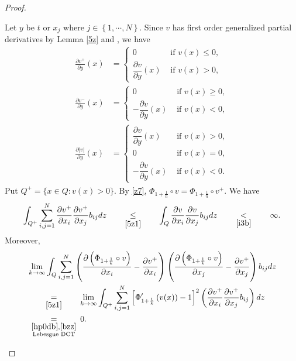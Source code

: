 \documentclass[11pt, a4paper]{article}
\numberwithin{equation}{section}
\newcommand{\coex}[2][\hphantom{longexplanation}]{%
  \underset{{#1}}{\overset{\hphantom{longexplanation}}{#2}}
}
\begin{document}
\begin{proof}
\begin{itemize}[wide]
  Let $y$ be $t$ or $x_{j}$ where $j\in
  \left\{1,\cdots,N\right\}$. Since $v$ has first order generalized
  partial derivatives by Lemma \ref{5z} and  \cite[Lemma 7.6]{gilbargEllipticPartialDifferential2001}, we have
\begin{align}
  \frac{\partial v^{+}}{\partial y}(x)
  &= \begin{cases}
    0 &\text{ if }  v(x) \le 0,   \\
    \dfrac{\partial v}{\partial y}(x) &\text{ if } v(x) > 0, 
\end{cases}
\label{5z1}\\
  \frac{\partial v^{-}}{\partial y}(x)
  &= \begin{cases}
 0 & \text{ if } v(x) \ge 0,  \\
       -\dfrac{\partial v}{\partial y}(x) &\text{ if } v(x) < 0, 
\end{cases}
\label{5z2}\\
  \frac{\partial |v|}{\partial y}(x)
  &= \begin{cases}
  \dfrac{\partial v}{\partial y}(x) &\text{ if } v(x) > 0,  \\
 0 &\text{ if } v(x)= 0,  \\
       -\dfrac{\partial v}{\partial y}(x) &\text{ if } v(x) < 0. 
\end{cases}
\label{5z3}
\end{align}
Put $Q^{+}=\{x\in Q : v(x)>0\}$.
By \eqref{z7}, $\Phi_{1+\frac{1}{n}}\circ v=\Phi_{1+\frac{1}{n}}\circ v^{+}$. We have
\begin{align}
  \label{bzz}
  \int_{Q^{+}}\sum_{i,j=1}^{N}\frac{\partial v^{+}}{\partial
  x_{i}}\frac{\partial v^{+}}{\partial x_{j}}b_{ij}dz
  \coex[\eqref{5z1}]{\le}
  \int_{Q}\frac{\partial v}{\partial x_{i}}\frac{\partial v}{\partial
  x_{j}}b_{ij}dz
  \coex[\eqref{i3b}]{<} \infty.
\end{align}
Moreover,
\begin{align*}
&\lim_{k\to \infty}\int_{Q}\sum_{i,j=1}^{N} \left(\frac{\partial
  \left(\Phi_{1+\frac{1}{k}}\circ v \right)}{\partial x_{i}}-\frac{\partial
  v^{+}}{\partial x_{i}} \right) \left(\frac{\partial
  \left(\Phi_{1+\frac{1}{k}}\circ v \right)}{\partial x_{j}}-\frac{\partial
  v^{+}}{\partial x_{j}} \right)b_{ij} dz \\
&\coex[\eqref{5z1}]{=}
  \lim_{k\to \infty }\int_{Q^{+}}\sum_{i,j=1}^{N}
  \left[\Phi_{1+\frac{1}{k}}'\left(v(x) \right)-1 \right]^{2}
  \left(\frac{\partial v^{+}}{\partial x_{i}}\frac{\partial
  v^{+}}{\partial x_{j}}b_{ij} \right) dz\\
  &\coex[\substack{\eqref{hp0db},\eqref{bzz}\\ \text{Lebesgue DCT}}]{=}0.
\end{align*}


\end{itemize}
\end{proof}
\end{document}
